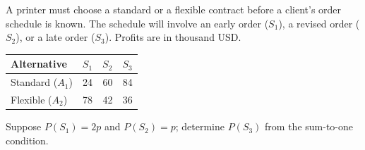 \clearpage
{}
A printer must choose a standard or a flexible contract before a client's order schedule is known. The schedule will involve an early order ($S_1$), a revised order ($S_2$), or a late order ($S_3$). Profits are in thousand USD.
\begin{center}\small\setlength{\tabcolsep}{4pt}
\begin{tabular}{@{}lrrr@{}}\toprule
Alternative&$S_1$&$S_2$&$S_3$\\\midrule
Standard ($A_1$)&24&60&84\\
Flexible ($A_2$)&78&42&36\\\bottomrule
\end{tabular}\end{center}
Suppose $P(S_1)=2p$ and $P(S_2)=p$; determine $P(S_3)$ from the sum-to-one condition.
